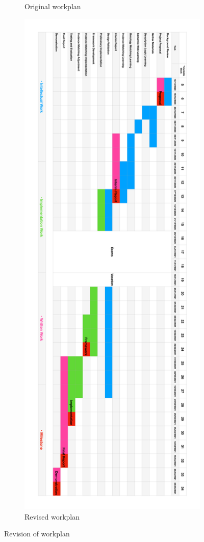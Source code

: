 \begin{figure}[ht]
\begin{subfigure}[ht]{0.5\textwidth}
\caption{Original workplan}
\label{fig:Gantt_old}
\end{subfigure}
\begin{subfigure}[ht]{0.5\textwidth}
\includegraphics[width=\textwidth]{img/Gantt_new.pdf}
\caption{Revised workplan}
\label{fig:Gantt_new}
\end{subfigure}
\caption{Revision of workplan}
\label{fig:Gantt}
\end{figure}

